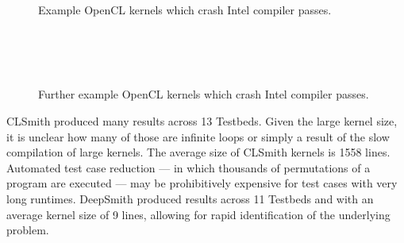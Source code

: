 \begin{figure}
  \centering
  \\%
  \\%
  \\%
  \\%
  \\%
  \caption[Example kernels which crash Intel compiler passes]{%
    Example OpenCL kernels which crash Intel compiler passes.%
  }%
  \label{lst:intel-passes}
\end{figure}

\begin{figure}
	\centering
	\\%
	\\%
	\\%
	\caption[Further example kernels which crash Intel compiler passes]{%
    Further example OpenCL kernels which crash Intel compiler passes.%
	}%
	\label{lst:further-intel-passes}
\end{figure}

CLSmith produced many \bto results across 13 Testbeds. Given the large kernel size, it is unclear how many of those are infinite loops or simply a result of the slow compilation of large kernels. The average size of CLSmith \bto kernels is 1558 lines. Automated test case reduction --- in which thousands of permutations of a program are executed --- may be prohibitively expensive for test cases with very long runtimes. DeepSmith produced \bto results across 11 Testbeds and with an average kernel size of 9 lines, allowing for rapid identification of the underlying problem.

